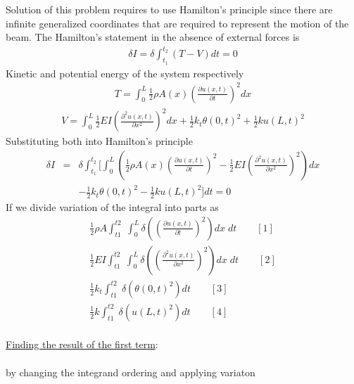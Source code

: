 \documentclass[]{report}
\begin{document}
Solution of this problem requires to use Hamilton's principle since there are infinite generalized coordinates that are required to represent the motion of the beam. The Hamilton's statement in the absence of external forces is
\begin{eqnarray*}
\delta I =\delta \int_{t_1}^{t_2} \left(T-V \right)dt=0
\end{eqnarray*}
Kinetic and potential energy of the system respectively
\begin{eqnarray*}
T= \int_{0}^{L}\frac{1}{2}\rho A \left(x\right) {\left(\frac{\partial{ u\left(x,t\right)}}{\partial{t}}\right)}^2  dx
\end{eqnarray*}
\begin{eqnarray*}
V= \int_{0}^{L}\frac{1}{2} E I {\left(\frac{\partial^2{u\left(x,t\right)}}{\partial{x^2}}\right)}^2 dx+\frac{1}{2}k_t {\theta{\left(0,t\right)}}^2+\frac{1}{2} k {u \left(L,t\right)}^2
\end{eqnarray*}
Substituting both into Hamilton's principle
\begin{eqnarray}
\label{variation_of_functional}
\delta I& =&\delta \int_{t_1}^{t_2}\biggl[\int_{0}^{L}\left(\frac{1}{2}\rho A \left(x\right) {\left(\frac{\partial{ u\left(x,t\right)}}{\partial{t}}\right)}^2 -\frac{1}{2} E I {\left(\frac{\partial^2{u\left(x,t\right)}}{\partial{x^2}}\right)^2}\right) dx \nonumber\\
&&-\frac{1}{2}k_t {\theta{\left(0,t\right)}}^2-\frac{1}{2} k {u \left(L,t\right)}^2\biggr]dt=0
\end{eqnarray}
If we divide variation of the integral into parts as
\begin{eqnarray*}
 \frac{1}{2}\rho A \int_{t1}^{t2} \; \int_{0}^{L} \delta\left( {\left(\frac{\partial{ u\left(x,t\right)}}{\partial{t}}\right)}^2 \right) dx \; dt\qquad\left[1\right] \\
 \frac{1}{2}E I \int_{t1}^{t2} \;\int_{0}^{L}  \delta\left( {\left(\frac{\partial^2{u\left(x,t\right)}}{\partial{x^2}}\right)}^2\right) dx\; dt\qquad\left[2\right]\\
\frac{1}{2}k_t \int_{t1}^{t2} \;\delta \left({\theta{\left(0,t\right)}}^2\right)dt\qquad\left[3\right]\\
\frac{1}{2} k \int_{t1}^{t2} \; \delta \left( {u \left(L,t\right)}^2\right)dt\qquad\left[4\right]
\end{eqnarray*}
\\
\underline{Finding the result of the first term}:\\
\\
by changing the integrand ordering and applying variaton
\end{document}
